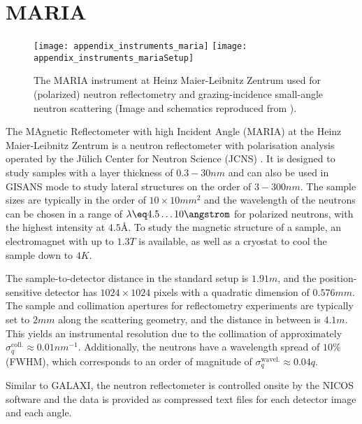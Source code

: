 \documentclass[\main/dresen_thesis.tex]{subfiles}
\begin{document}
  \section{MARIA}\label{ch:lss:maria}
    \begin{figure}[ht]
      \centering
      \texttt{[image: appendix\_instruments\_maria]}
      \texttt{[image: appendix\_instruments\_mariaSetup]}
      \caption{\label{fig:lss:maria}The MARIA instrument at Heinz Maier-Leibnitz Zentrum used for (polarized) neutron reflectometry and grazing-incidence small-angle neutron scattering (Image and schematics reproduced from \cite{Heinz_2015_Maria}).}
    \end{figure}

    The MAgnetic Reflectometer with high Incident Angle (MARIA) at the Heinz Maier-Leibnitz Zentrum is a neutron reflectometer with polarisation analysis operated by the J\"ulich Center for Neutron Science (JCNS) \cite{Heinz_2015_Maria}.
    It is designed to study samples with a layer thickness of $0.3 - 30 \unit{nm}$ and can also be used in GISANS mode to study lateral structures on the order of $3 - 300 \unit{nm}$.
    The sample sizes are typically in the order of $10 \times 10 \unit{mm^2}$ and the wavelength of the neutrons can be chosen in a range of $\lambda \eq 4.5 \ldots 10 \angstrom$ for polarized neutrons, with the highest intensity at $4.5 \unit{\angstrom}$.
    To study the magnetic structure of a sample, an electromagnet with up to $1.3 \unit{T}$ is available, as well as a cryostat to cool the sample down to $4 \unit{K}$.

    The sample-to-detector distance in the standard setup is $1.91 \unit{m}$, and the position-sensitive detector has $1024 \times 1024$ pixels with a quadratic dimension of $0.576 \unit{mm}$.
    The sample and collimation apertures for reflectometry experiments are typically set to $2 \unit{mm}$ along the scattering geometry, and the distance in between is $4.1 \unit{m}$.
    This yields an instrumental resolution due to the collimation of approximately $\sigma_q^\mathrm{coll.} \approx 0.01\unit{nm}^{-1}$.
    Additionally, the neutrons have a wavelength spread of $10 \unit{\%}$ (FWHM), which corresponds to an order of magnitude of $\sigma_q^\mathrm{wavel.} \approx 0.04 q$.

    Similar to GALAXI, the neutron reflectometer is controlled onsite by the NICOS software and the data is provided as compressed text files for each detector image and each angle.
\end{document}
